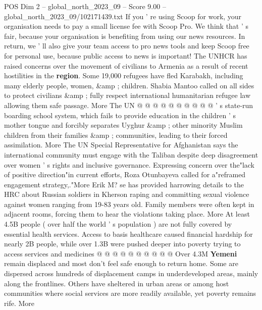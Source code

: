 \begin{textsample}{POS Dim 2 – global\_north\_2023\_09 – Score 9.00 – global\_north\_2023\_09/102171439.txt}
If you ' re using Scoop for work, your organisation needs to pay a small license fee with Scoop Pro.
We think that ' s fair, because your organisation is benefiting from using our news resources.
In return, we ' ll also give your team access to pro news tools and keep Scoop free for personal use, because public access to news is important!
The UNHCR has raised concerns over the movement of civilians to Armenia as a result of recent hostilities in the \textbf{region}.
Some 19,000 refugees have fled Karabakh, including many elderly people, women, \&amp ; children.
Shabia Mantoo called on all sides to protect civilians \&amp ; fully respect international humanitarian refugee law allowing them safe passage.
More The UN @ @ @ @ @ @ @ @ @ @ ' s state-run boarding school system, which fails to provide education in the children ' s mother tongue and forcibly separates Uyghur \&amp ; other minority Muslim children from their families \&amp ; communities, leading to their forced assimilation.
More The UN Special Representative for Afghanistan says the international community must engage with the Taliban despite deep disagreement over women ' s rights and inclusive governance.
Expressing concern over the"lack of positive direction"in current efforts, Roza Otunbayeva called for a"reframed engagement strategy,."More Erik M? se has provided harrowing details to the HRC about Russian soldiers in Kherson raping and committing sexual violence against women ranging from 19-83 years old.
Family members were often kept in adjacent rooms, forcing them to hear the violations taking place.
More At least 4.5B people ( over half the world ' s population ) are not fully covered by essential health services.
Access to basis healthcare caused financial hardship for nearly 2B people, while over 1.3B were pushed deeper into poverty trying to access services and medicines @ @ @ @ @ @ @ @ @ @ Over 4.3M \textbf{Yemeni} remain displaced and most don't feel safe enough to return home.
Some are dispersed across hundreds of displacement camps in underdeveloped areas, mainly along the frontlines.
Others have sheltered in urban areas or among host communities where social services are more readily available, yet poverty remains rife.
More

\end{textsample}
